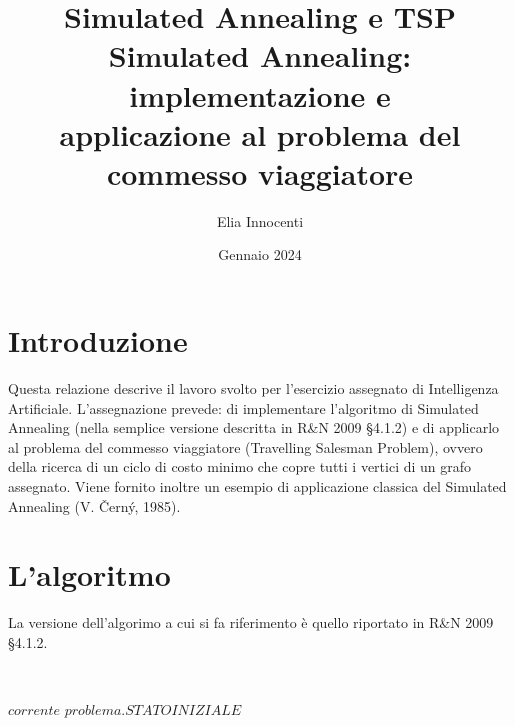 \documentclass[11pt]{article}
\title{Simulated Annealing e TSP \\
       \vspace{0.5em}
       \large Simulated Annealing: implementazione e \\
              applicazione al problema del commesso viaggiatore}
\author{Elia Innocenti}
\date{Gennaio 2024}
\begin{document}

    \maketitle

    \section{Introduzione} \label{sec:introduction}

        Questa relazione descrive il lavoro svolto per l'esercizio assegnato di Intelligenza Artificiale.
        L'assegnazione prevede: di implementare l'algoritmo di Simulated Annealing (nella semplice versione descritta in R&N 2009 §4.1.2) e
        di applicarlo al problema del commesso viaggiatore (Travelling Salesman Problem),
        ovvero della ricerca di un ciclo di costo minimo che copre tutti i vertici di un grafo assegnato.
        Viene fornito inoltre un esempio di applicazione classica del Simulated Annealing (V. Černý, 1985).

    \section{L'algoritmo} \label{sec:algorithm_analysis}

        La versione dell'algorimo a cui si fa riferimento è quello riportato in R&N 2009 §4.1.2.

        \begin{algorithm}[H] \label{alg:simulated_annealing_algorithm}
            \SetAlgoLined
            \vspace{0.5em}
             \\
            \vspace{0.5em}

                $corrente$ \leftarrow $problema.STATOINIZIALE$ \\
        \end{algorithm}
\end{document}
